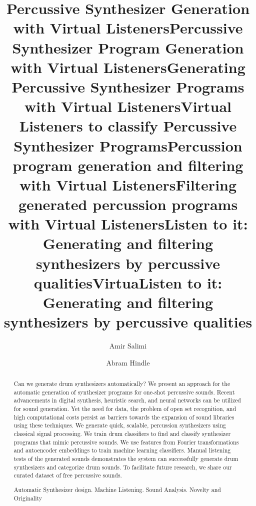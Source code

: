 \documentclass[runningheads,a4paper]{llncs}
\newcommand{\keywords}[1]{\par\addvspace\baselineskip
\noindent\keywordname\enspace\ignorespaces#1}
\begin{document}
\mainmatter  

\title{Percussive Synthesizer Generation with Virtual Listeners}
\title{Percussive Synthesizer Program Generation with Virtual Listeners}
\title{Generating Percussive Synthesizer Programs with Virtual Listeners}
\title{Virtual Listeners to classify Percussive Synthesizer Programs}
\title{Percussion program generation and filtering with Virtual Listeners}
\title{Filtering generated percussion programs with Virtual Listeners}
\title{Listen to it: Generating and filtering synthesizers by percussive qualities}
\title{VirtuaListen to it: Generating and filtering synthesizers by percussive qualities}



\author{Amir Salimi \and Abram Hindle}



\maketitle

\begin{abstract}
Can we generate drum synthesizers automatically?
We present an approach for the automatic generation of synthesizer programs for one-shot percussive sounds. 
Recent advancements in digital synthesis, heuristic search, and neural networks can be utilized for sound generation. 
Yet the need for data, the problem of open set recognition, and high computational costs persist as barriers towards the expansion of sound libraries using these techniques. 
We generate quick, scalable, percussion synthesizers using classical signal processing. 
We train drum classifiers to find and classify synthesizer programs that mimic percussive sounds. 
We use features from Fourier transformations and autoencoder embeddings to train machine learning classifiers.
Manual listening tests of the generated sounds demonstrates the system can successfully generate drum synthesizers and categorize drum sounds.
To facilitate future research, we share our curated dataset of free percussive sounds.
\keywords{Automatic Synthesizer design. Machine Listening. Sound Analysis. Novelty and Originality}
\end{abstract}
\end{document}
